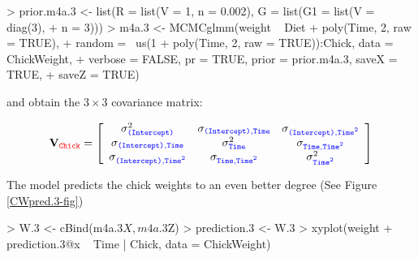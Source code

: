 \documentclass{article}
\begin{document}
\begin{Schunk}
\begin{Sinput}
> prior.m4a.3 <- list(R = list(V = 1, n = 0.002), G = list(G1 = list(V = diag(3), 
+     n = 3)))
> m4a.3 <- MCMCglmm(weight ~ Diet + poly(Time, 2, raw = TRUE), 
+     random = ~us(1 + poly(Time, 2, raw = TRUE)):Chick, data = ChickWeight, 
+     verbose = FALSE, pr = TRUE, prior = prior.m4a.3, saveX = TRUE, 
+     saveZ = TRUE)
\end{Sinput}
\end{Schunk}

and obtain the $3\times3$ covariance matrix:

\begin{displaymath}
{\bf V}_{{\color{red} \texttt{Chick}}}=
\left[
\begin{array}{ccc}
\sigma^{2}_{\color{blue}\texttt{(Intercept)}}&\sigma_{\color{blue}\texttt{(Intercept)}, \texttt{Time}}&\sigma_{\color{blue}\texttt{(Intercept)}, \texttt{Time$^{2}$}}\\
\sigma_{\color{blue}\texttt{(Intercept)}, \texttt{Time}}&\sigma^{2}_{\color{blue} \texttt{Time}}&\sigma_{\color{blue}\texttt{Time}, \texttt{Time$^{2}$}}\\
\sigma_{\color{blue}\texttt{(Intercept)}, \texttt{Time$^2$}}&\sigma_{\color{blue}\texttt{Time}, \texttt{Time$^{2}$}}&\sigma^{2}_{\color{blue} \texttt{Time$^2$}}\\
\end{array}
\right]
\end{displaymath}

The model predicts the chick weights to an even better degree  (See Figure \ref{CWpred.3-fig})

\begin{Schunk}
\begin{Sinput}
> W.3 <- cBind(m4a.3$X, m4a.3$Z)
> prediction.3 <- W.3 %
> xyplot(weight + prediction.3@x ~ Time | Chick, data = ChickWeight)
\end{Sinput}
\end{Schunk}
\end{document}
